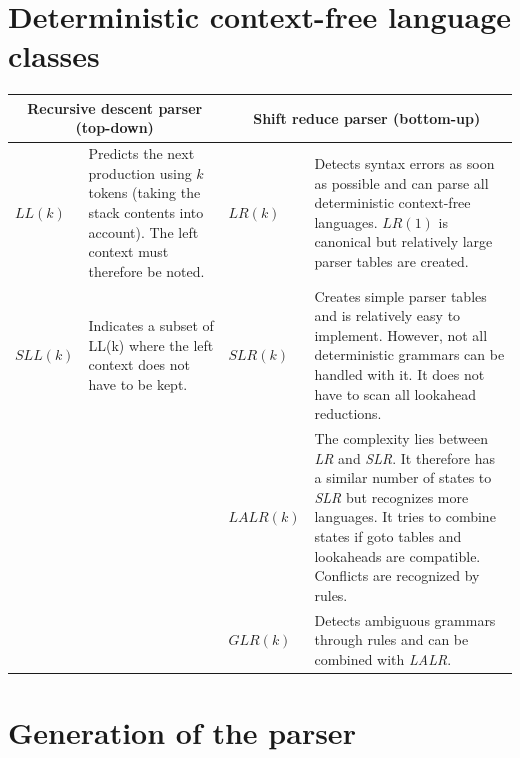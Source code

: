 \newpage

\section*{Deterministic context-free language classes}
\label{sec:det_cfg_classes}

\begin{table}[bth]
	\centering
	\begin{tabular}{p{1.3cm}p{5.25cm}|p{1.6cm}|p{5.25cm}|}
		\hline
		\multicolumn{2}{|c|}{\textbf{Recursive descent parser (top-down)}} & \multicolumn{2}{c|}{\textbf{Shift reduce parser (bottom-up)}} \\ \hline
		\multicolumn{1}{|l|}{$LL(k)$}             & Predicts the next production using $k$ tokens (taking the stack contents into account). The left context must therefore be noted.           & $LR(k)$                     & Detects syntax errors as soon as possible and can parse all deterministic context-free languages. $LR(1)$ is canonical but relatively large parser tables are created.                   \\ \hline
		\multicolumn{1}{|l|}{$SLL(k)$}            & Indicates a subset of LL(k) where the left context does not have to be kept.            & $SLR(k)$                    & Creates simple parser tables and is relatively easy to implement. However, not all deterministic grammars can be handled with it. It does not have to scan all lookahead reductions.                   \\ \hline
		&               & $LALR(k)$                   & The complexity lies between \emph{LR} and \emph{SLR}. It therefore has a similar number of states to \emph{SLR} but recognizes more languages. It tries to combine states if goto tables and lookaheads are compatible. Conflicts are recognized by rules.                   \\ \cline{3-4} 
		&               & $GLR(k)$                    & Detects ambiguous grammars through rules and can be combined with \emph{LALR}.                   \\ \cline{3-4} 
	\end{tabular}
\end{table}

\newpage

\section*{Generation of the parser}
\label{sec:parser}

